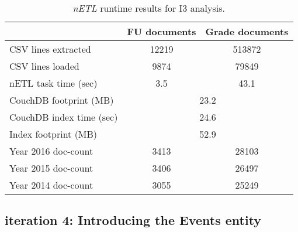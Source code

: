 \begin{table}[]
    \centering
    \caption{\textit{nETL} runtime results for I3 analysis.}
    \label{i3-results}
    \begin{tabular}{lcc}
                                 & FU documents             & Grade documents \\ \hline
        CSV lines extracted      & 12219                    & 513872          \\
        CSV lines loaded         & 9874                     & 79849           \\
        nETL task time (sec)     & 3.5                      & 43.1            \\
        CouchDB footprint (MB)   & \multicolumn{2}{c}{23.2}                   \\
        CouchDB index time (sec) & \multicolumn{2}{c}{24.6}                   \\
        Index footprint (MB)     & \multicolumn{2}{c}{52.9}                   \\
        Year 2016 doc-count      & 3413                     & 28103           \\
        Year 2015 doc-count      & 3406                     & 26497           \\
        Year 2014 doc-count      & 3055                     & 25249           \\
    \end{tabular}
\end{table}

\subsection{iteration 4: Introducing the Events entity}